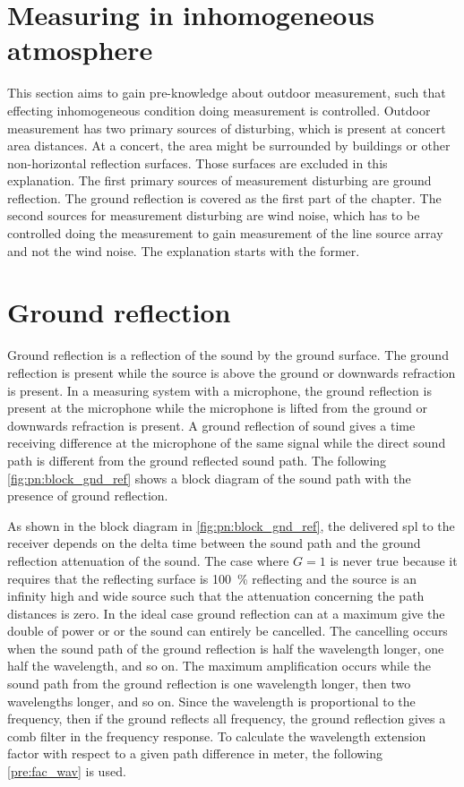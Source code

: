 \section{Measuring in inhomogeneous atmosphere}
This section aims to gain pre-knowledge about outdoor measurement, such that effecting inhomogeneous condition doing measurement is controlled. Outdoor measurement has two primary sources of disturbing, which is present at concert area distances. At a concert, the area might be surrounded by buildings or other non-horizontal reflection surfaces. Those surfaces are excluded in this explanation. The first primary sources of measurement disturbing are ground reflection. The ground reflection is covered as the first part of the chapter. The second sources for measurement disturbing are wind noise, which has to be controlled doing the measurement to gain measurement of the line source array and not the wind noise. The explanation starts with the former.

\section{Ground reflection}\label{pre:ground_ref}
Ground reflection is a reflection of the sound by the ground surface. The ground reflection is present while the source is above the ground or downwards refraction is present. In a measuring system with a microphone, the ground reflection is present at the microphone while the microphone is lifted from the ground or downwards refraction is present. A ground reflection of sound gives a time receiving difference at the microphone of the same signal while the direct sound path is different from the ground reflected sound path. The following \autoref{fig:pn:block_gnd_ref} shows a block diagram of the sound path with the presence of ground reflection.



As shown in the block diagram in \autoref{fig:pn:block_gnd_ref}, the delivered \gls{spl} to the receiver depends on the delta time between the sound path and the ground reflection attenuation of the sound. The case where $G=1$ is never true because it requires that the reflecting surface is \SI{100}{\percent} reflecting and the source is an infinity high and wide source such that the attenuation concerning the path distances is zero. In the ideal case ground reflection can at a maximum give the double of power or  or the sound can entirely be cancelled. The cancelling occurs when the sound path of the ground reflection is half the wavelength longer, one half the wavelength, and so on. The maximum amplification occurs while the sound path from the ground reflection is one wavelength longer, then two wavelengths longer, and so on. Since the wavelength is proportional to the frequency, then if the ground reflects all frequency, the ground reflection gives a comb filter in the frequency response. To calculate the wavelength extension factor with respect to a given path difference in meter, the following \autoref{pre:fac_wav} is used.

